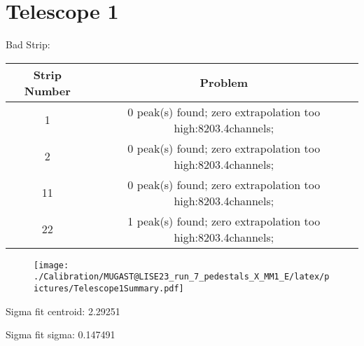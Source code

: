 \documentclass[a4paper,6pt]{article}
\begin{document}
\section{Telescope 1 }
 Bad Strip:
\begin{center}
\begin{tabular}{ | c | c | } 
\hline 
 Strip Number & Problem \\ \hline 
1 &  0 peak(s) found; zero extrapolation too high:8203.4channels;  \\ \hline 
2 &  0 peak(s) found; zero extrapolation too high:8203.4channels;  \\ \hline 
11 &  0 peak(s) found; zero extrapolation too high:8203.4channels;  \\ \hline 
22 &  1 peak(s) found; zero extrapolation too high:8203.4channels;  \\ \hline 
\end{tabular} 
\end{center}
\begin{figure}[htcb!]
\begin{center}
\texttt{[image: ./Calibration/MUGAST@LISE23\_run\_7\_pedestals\_X\_MM1\_E/latex/pictures/Telescope1Summary.pdf]}
\end{center}
\end{figure}
\pagebreak
Sigma fit centroid: 2.29251

Sigma fit sigma: 0.147491
\end{document}
